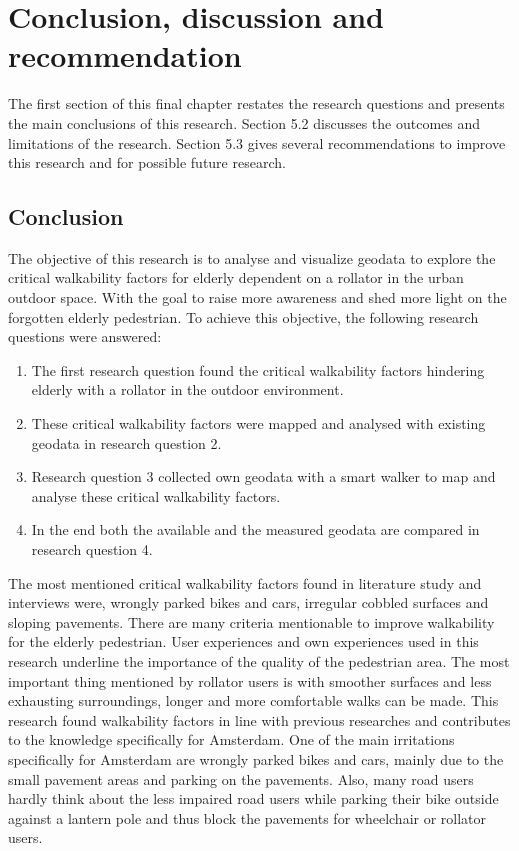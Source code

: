 \chapter{Conclusion, discussion and recommendation} 
The first section of this final chapter restates the research questions and presents the main conclusions of this research. Section 5.2 discusses the outcomes and limitations of the research. Section 5.3 gives several recommendations to improve this research and for possible future research.

\section{Conclusion} %
The objective of this research is to analyse and visualize geodata to explore the critical walkability factors for elderly dependent on a rollator in the urban outdoor space. With the goal to raise more awareness and shed more light on the forgotten elderly pedestrian. To achieve this objective, the following research questions were answered:

\begin{enumerate}
	\item The first research question found the critical walkability factors hindering elderly with a rollator in the outdoor environment.
	\item These critical walkability factors were mapped and analysed with existing geodata in research question 2. 
 	\item Research question 3 collected own geodata with a smart walker to map and analyse these critical walkability factors.
	\item In the end both the available and the measured geodata are compared in research question 4. 
\end{enumerate}



The most mentioned critical walkability factors found in literature study and interviews were, wrongly parked bikes and cars, irregular cobbled surfaces and sloping pavements. There are many criteria mentionable to improve walkability for the elderly pedestrian. User experiences and own experiences used in this research underline the importance of the quality of the pedestrian area. The most important thing mentioned by rollator users is with smoother surfaces and less exhausting surroundings, longer and more comfortable walks can be made. This research found walkability factors in line with previous researches and contributes to the knowledge specifically for Amsterdam. One of the main irritations specifically for Amsterdam are wrongly parked bikes and cars, mainly due to the small pavement areas and parking on the pavements. Also, many road users hardly think about the less impaired road users while parking their bike outside against a lantern pole and thus block the pavements for wheelchair or rollator users.

